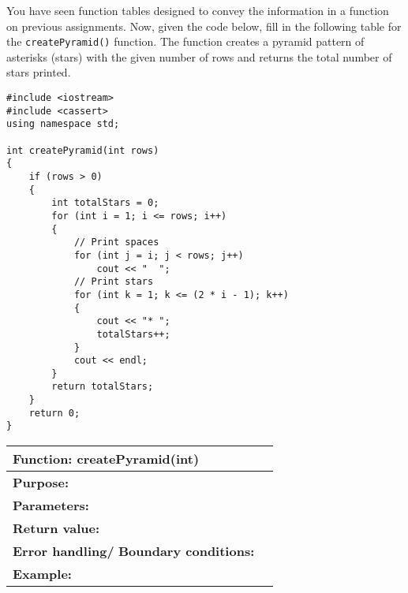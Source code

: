 \begin{problem}
    You have seen function tables designed to convey the information in a function on previous assignments. Now, given the code below, fill in the following table for the \texttt{createPyramid()} function. The function creates a pyramid pattern of asterisks (stars) with the given number of rows and returns the total number of stars printed.

\begin{verbatim}
#include <iostream>
#include <cassert>
using namespace std;

int createPyramid(int rows)
{
    if (rows > 0)
    {
        int totalStars = 0;
        for (int i = 1; i <= rows; i++)
        {
            // Print spaces
            for (int j = i; j < rows; j++)
                cout << "  ";
            // Print stars
            for (int k = 1; k <= (2 * i - 1); k++)
            {
                cout << "* ";
                totalStars++;
            }
            cout << endl;
        }
        return totalStars;
    }
    return 0;
}
\end{verbatim}

\newpage

\begin{longtable}[H]{|p{1.7in}|p{4.0in}|} \hline
    \textbf{Function:} \newline 
    createPyramid(int) & \\ \hline
    \textbf{Purpose:}  &  \\ \hline
    \textbf{Parameters:} &   \\ \hline
    \textbf{Return value:} &   \\ \hline
    \textbf{Error handling/} \newline
    \textbf{Boundary conditions:} & \\ \hline
    \textbf{Example:} & 
    \begin{exmaple}
    \begin{verbatim}    
int main()
{
    int totalStars = createPyramid(3);
    cout << "Total stars printed: " << totalStars << endl;
    return 0;
}
    \end{verbatim}
    \end{example}

    \begin{sample}
        * 
        
      * * * 
      
    * * * * * 
    
    Total stars printed: 9
    \end{sample}
         \\ \hline
\end{longtable}
\end{problem}

